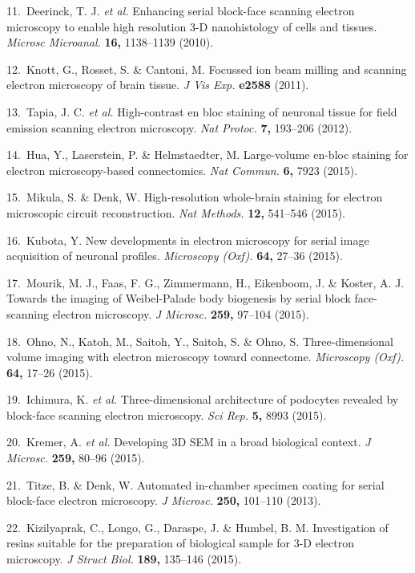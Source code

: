 \documentclass{article}
\newenvironment{reflist}{\par\small\setlength{\parindent}{0pt}\everypar{\hangindent=2.2em\hangafter=1}}{\par}
\begin{document}
\begin{reflist}
11.~Deerinck, T. J. \emph{et al.} Enhancing serial block-face scanning electron microscopy to enable high resolution 3-D nanohistology of cells and tissues. \emph{Microsc Microanal.} \textbf{16,} 1138–1139 (2010).

12.~Knott, G., Rosset, S. \& Cantoni, M. Focussed ion beam milling and scanning electron microscopy of brain tissue. \emph{J Vis Exp.} \textbf{e2588} (2011).

13.~Tapia, J. C. \emph{et al.} High-contrast en bloc staining of neuronal tissue for field emission scanning electron microscopy. \emph{Nat Protoc.} \textbf{7,} 193–206 (2012).

14.~Hua, Y., Laserstein, P. \& Helmstaedter, M. Large-volume en-bloc staining for electron microscopy-based connectomics. \emph{Nat Commun.} \textbf{6,} 7923 (2015).

15.~Mikula, S. \& Denk, W. High-resolution whole-brain staining for electron microscopic circuit reconstruction. \emph{Nat Methods.} \textbf{12,} 541–546 (2015).

16.~Kubota, Y. New developments in electron microscopy for serial image acquisition of neuronal profiles. \emph{Microscopy (Oxf).} \textbf{64,} 27–36 (2015).

17.~Mourik, M. J., Faas, F. G., Zimmermann, H., Eikenboom, J. \& Koster, A. J. Towards the imaging of Weibel-Palade body biogenesis by serial block face-scanning electron microscopy. \emph{J Microsc.} \textbf{259,} 97–104 (2015).

18.~Ohno, N., Katoh, M., Saitoh, Y., Saitoh, S. \& Ohno, S. Three-dimensional volume imaging with electron microscopy toward connectome. \emph{Microscopy (Oxf).} \textbf{64,} 17–26 (2015).

19.~Ichimura, K. \emph{et al.} Three-dimensional architecture of podocytes revealed by block-face scanning electron microscopy. \emph{Sci Rep.} \textbf{5,} 8993 (2015).

20.~Kremer, A. \emph{et al.} Developing 3D SEM in a broad biological context. \emph{J Microsc.} \textbf{259,} 80–96 (2015).

21.~Titze, B. \& Denk, W. Automated in-chamber specimen coating for serial block-face electron microscopy. \emph{J Microsc.} \textbf{250,} 101–110 (2013).

22.~Kizilyaprak, C., Longo, G., Daraspe, J. \& Humbel, B. M. Investigation of resins suitable for the preparation of biological sample for 3-D electron microscopy. \emph{J Struct Biol.} \textbf{189,} 135–146 (2015).


\end{reflist}
\end{document}

